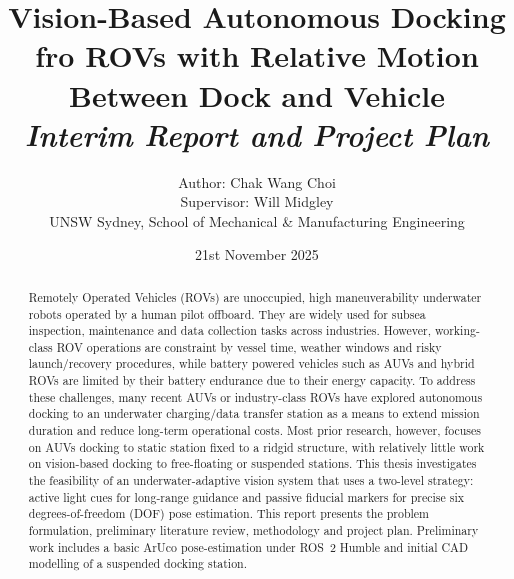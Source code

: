 \title{\textbf{Vision-Based Autonomous Docking fro ROVs with Relative Motion Between Dock and Vehicle\\ \textit{Interim Report and Project Plan\vspace{6mm}}}}
\author{Author: Chak Wang Choi \vspace{2mm} \\ Supervisor: Will Midgley \vspace{4mm} \\ UNSW Sydney, School of Mechanical \& Manufacturing Engineering}
\date{21st November 2025}

\maketitle

\begin{abstract}
    Remotely Operated Vehicles (ROVs) are unoccupied, high maneuverability underwater robots operated by a human pilot offboard. They are widely used for subsea inspection, maintenance and data collection tasks across industries. However, working-class ROV operations are constraint by vessel time, weather windows and risky launch/recovery procedures, while battery powered vehicles such as AUVs and hybrid ROVs are limited by their battery endurance due to their energy capacity. To address these challenges, many recent AUVs or industry-class ROVs have explored autonomous docking to an underwater charging/data transfer station as a means to extend mission duration and reduce long-term operational costs. Most prior research, however, focuses on AUVs docking to static station fixed to a ridgid structure, with relatively little work on vision-based docking to free-floating or suspended stations. This thesis investigates the feasibility of an underwater-adaptive vision system that uses a two-level strategy: active light cues for long-range guidance and passive fiducial markers for precise six degrees-of-freedom (DOF) pose estimation. This report presents the problem formulation, preliminary literature review, methodology and project plan. Preliminary work includes a basic ArUco pose-estimation under ROS~2 Humble and initial CAD modelling of a suspended docking station.
\end{abstract}


\printnomenclature

